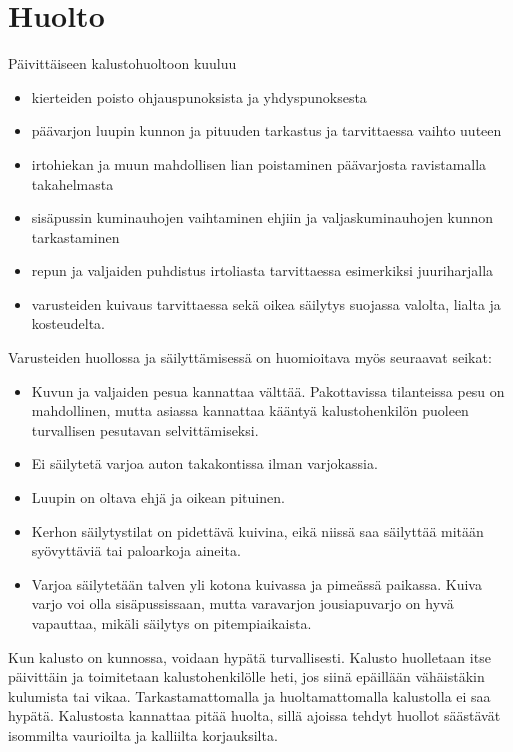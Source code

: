 \section{ Huolto }
\label{kaluston-tarkastus-ja-huolto-huolto}


Päivittäiseen kalustohuoltoon kuuluu 

\begin{itemize}
\item  kierteiden poisto ohjauspunoksista ja yhdyspunoksesta 
\item  päävarjon luupin kunnon ja pituuden tarkastus ja tarvittaessa vaihto uuteen 
\item  irtohiekan ja muun mahdollisen lian poistaminen päävarjosta ravistamalla takahelmasta 
\item  sisäpussin kuminauhojen vaihtaminen ehjiin ja valjaskuminauhojen kunnon tarkastaminen 
\item  repun ja valjaiden puhdistus irtoliasta tarvittaessa esimerkiksi juuriharjalla 
\item  varusteiden kuivaus tarvittaessa sekä oikea säilytys suojassa valolta, lialta ja kosteudelta. 
\end{itemize}

Varusteiden huollossa ja säilyttämisessä on huomioitava myös seuraavat seikat: 

\begin{itemize}
\item  Kuvun ja valjaiden pesua kannattaa välttää. Pakottavissa tilanteissa pesu on mahdollinen, mutta asiassa kannattaa kääntyä kalustohenkilön puoleen turvallisen pesutavan selvittämiseksi. 
\item  Ei säilytetä varjoa auton takakontissa ilman varjokassia. 
\item  Luupin on oltava ehjä ja oikean pituinen. 
\item  Kerhon säilytystilat on pidettävä kuivina, eikä niissä saa säilyttää mitään syövyttäviä tai paloarkoja aineita. 
\item  Varjoa säilytetään talven yli kotona kuivassa ja pimeässä paikassa. Kuiva varjo voi olla sisäpussissaan, mutta varavarjon jousiapuvarjo on hyvä vapauttaa, mikäli säilytys on pitempiaikaista.  
\end{itemize}

Kun kalusto on kunnossa, voidaan hypätä turvallisesti. Kalusto huolletaan itse päivittäin ja toimitetaan kalustohenkilölle heti, jos siinä epäillään vähäistäkin kulumista tai vikaa. Tarkastamattomalla ja huoltamattomalla kalustolla ei saa hypätä. Kalustosta kannattaa pitää huolta, sillä ajoissa tehdyt huollot säästävät isommilta vaurioilta ja kalliilta korjauksilta. 

